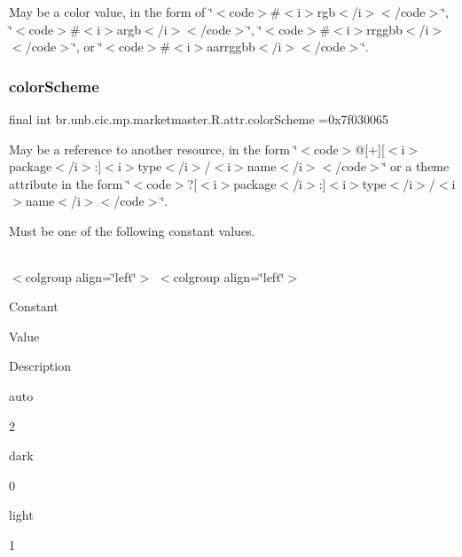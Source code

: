 May be a color value, in the form of \char`\"{}$<$code$>$\#$<$i$>$rgb$<$/i$>$$<$/code$>$\char`\"{}, \char`\"{}$<$code$>$\#$<$i$>$argb$<$/i$>$$<$/code$>$\char`\"{}, \char`\"{}$<$code$>$\#$<$i$>$rrggbb$<$/i$>$$<$/code$>$\char`\"{}, or \char`\"{}$<$code$>$\#$<$i$>$aarrggbb$<$/i$>$$<$/code$>$\char`\"{}. \mbox{\label{classbr_1_1unb_1_1cic_1_1mp_1_1marketmaster_1_1R_1_1attr_a16c65c07db2f9be37edb8320e996aa06}} 
\subsubsection{\texorpdfstring{color\+Scheme}{colorScheme}}
{\footnotesize\ttfamily final int br.\+unb.\+cic.\+mp.\+marketmaster.\+R.\+attr.\+color\+Scheme =0x7f030065\hspace{0.3cm}{\ttfamily [static]}}

May be a reference to another resource, in the form \char`\"{}$<$code$>$@\mbox{[}+\mbox{]}\mbox{[}$<$i$>$package$<$/i$>$\+:\mbox{]}$<$i$>$type$<$/i$>$/$<$i$>$name$<$/i$>$$<$/code$>$\char`\"{} or a theme attribute in the form \char`\"{}$<$code$>$?\mbox{[}$<$i$>$package$<$/i$>$\+:\mbox{]}$<$i$>$type$<$/i$>$/$<$i$>$name$<$/i$>$$<$/code$>$\char`\"{}. 

Must be one of the following constant values.

\tabulinesep=1mm
\begin{longtabu} spread 0pt [c]{*{0}{|X[-1]}|}
\hline
\end{longtabu}
$<$colgroup align=\char`\"{}left\char`\"{}$>$ $<$colgroup align=\char`\"{}left\char`\"{}$>$ 

Constant

Value

Description 

auto

2

dark

0

light

1\mbox{\label{classbr_1_1unb_1_1cic_1_1mp_1_1marketmaster_1_1R_1_1attr_a21517336bca59b128d4132b05cebb6aa}} 
